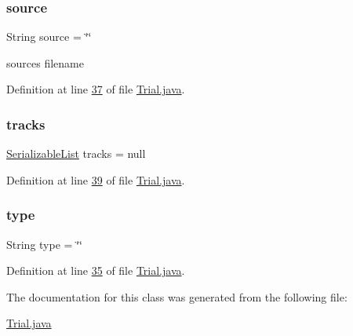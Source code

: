 \subsubsection{\texorpdfstring{source}{source}}
{\footnotesize\ttfamily String source = \char`\"{}\char`\"{}}

source\textquotesingle{}s filename 

Definition at line \hyperlink{_trial_8java_source_l00037}{37} of file \hyperlink{_trial_8java_source}{Trial.\+java}.

\hypertarget{classdata_1_1_trial_ab0c3156759c41236f7f0bc83e1e5ef8f}{}\label{classdata_1_1_trial_ab0c3156759c41236f7f0bc83e1e5ef8f} 
\subsubsection{\texorpdfstring{tracks}{tracks}}
{\footnotesize\ttfamily \hyperlink{classdata_1_1_serializable_list}{Serializable\+List} tracks = null}



Definition at line \hyperlink{_trial_8java_source_l00039}{39} of file \hyperlink{_trial_8java_source}{Trial.\+java}.

\hypertarget{classdata_1_1_trial_a0b86e44425dbe3c9d866aa273f87828a}{}\label{classdata_1_1_trial_a0b86e44425dbe3c9d866aa273f87828a} 
\subsubsection{\texorpdfstring{type}{type}}
{\footnotesize\ttfamily String type = \char`\"{}\char`\"{}}



Definition at line \hyperlink{_trial_8java_source_l00035}{35} of file \hyperlink{_trial_8java_source}{Trial.\+java}.



The documentation for this class was generated from the following file\+:\begin{DoxyCompactItemize}
\item 
\hyperlink{_trial_8java}{Trial.\+java}\end{DoxyCompactItemize}
